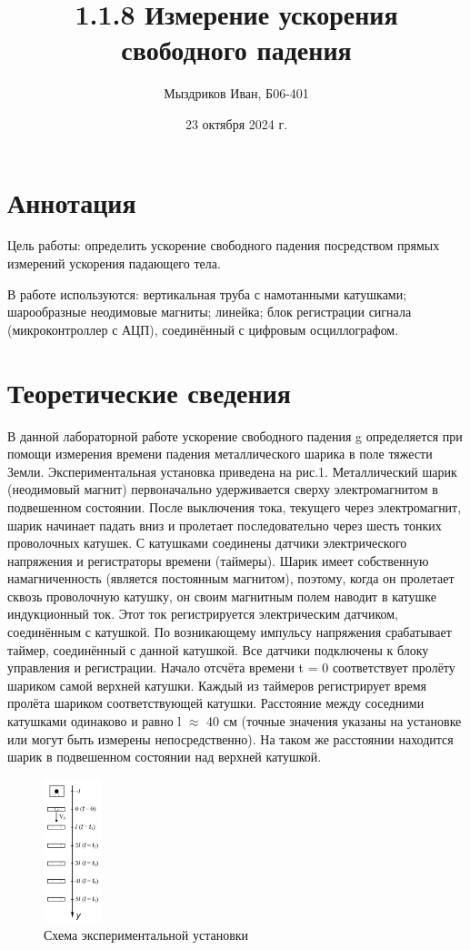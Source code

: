 \documentclass[a4paper, 10pt]{article}%
\title{1.1.8 Измерение ускорения свободного падения}
\author{Мыздриков Иван, Б06-401}
\date{23 октября 2024 г.}
\begin{document}
\maketitle

\section{Аннотация}
Цель работы: определить ускорение свободного падения посредством прямых измерений ускорения падающего тела. 

В работе используются: вертикальная труба с намотанными катушками; шарообразные неодимовые магниты; линейка; блок регистрации сигнала (микроконтроллер с АЦП), соединённый с цифровым осциллографом. 

\section{Теоретические сведения}
В данной лабораторной работе ускорение свободного падения g определяется при помощи измерения времени падения металлического шарика в поле тяжести Земли. Экспериментальная установка приведена на рис.1. Металлический шарик (неодимовый магнит) первоначально удерживается сверху электромагнитом в подвешенном состоянии. После выключения тока, текущего через электромагнит, шарик начинает падать вниз и пролетает последовательно через шесть тонких проволочных катушек. С катушками соединены датчики электрического напряжения и регистраторы времени (таймеры). Шарик имеет собственную намагниченность (является постоянным магнитом), поэтому, когда он пролетает сквозь проволочную катушку, он своим магнитным полем наводит в катушке индукционный ток. Этот ток регистрируется электрическим датчиком, соединённым с катушкой. По возникающему импульсу напряжения срабатывает таймер, соединённый с данной катушкой.  
Все датчики подключены к блоку управления и регистрации. Начало отсчёта времени t = 0 соответствует пролёту шариком самой верхней катушки. Каждый из таймеров регистрирует время пролёта шариком соответствующей катушки. Расстояние между соседними катушками одинаково и равно l $\approx$ 40 см (точные значения указаны на установке или могут быть измерены непосредственно). На таком же расстоянии находится шарик в подвешенном состоянии над верхней катушкой.  
\begin{figure}[h]
    \centering
    \includegraphics[width=0.15\textwidth]{изображение.png}
    \caption{Схема экспериментальной установки}
    \label{fig:mesh1}
\end{figure}
\end{document}
